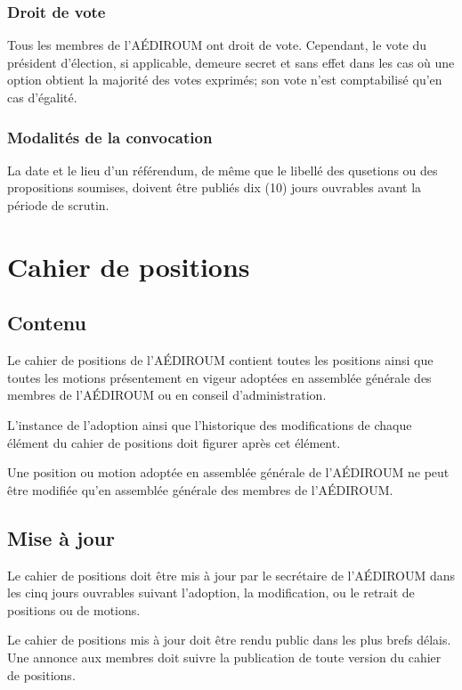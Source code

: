 \documentclass[12pt]{article}
\begin{document}
\subsubsection{Droit de vote}

Tous les membres de l'AÉDIROUM ont droit de vote. Cependant, le vote du président d'élection, si applicable, demeure secret et sans effet dans les cas où une option obtient la majorité des votes exprimés; son vote n'est comptabilisé qu'en cas d'égalité.

\subsubsection{Modalités de la convocation}

La date et le lieu d'un référendum, de même que le libellé des qusetions ou des propositions soumises, doivent être publiés dix (10) jours ouvrables avant la période de scrutin.

\section{Cahier de positions}

\subsection{Contenu}

Le cahier de positions de l’AÉDIROUM contient toutes les positions ainsi que toutes les motions présentement en vigeur adoptées en assemblée générale des membres de l’AÉDIROUM ou en conseil d’administration.

L’instance de l’adoption ainsi que l’historique des modifications de chaque élément du cahier de positions doit figurer après cet élément.

Une position ou motion adoptée en assemblée générale de l’AÉDIROUM ne peut être modifiée qu’en assemblée générale des membres de l’AÉDIROUM.

\subsection{Mise à jour}

Le cahier de positions doit être mis à jour par le secrétaire de l’AÉDIROUM dans les cinq jours ouvrables suivant l’adoption, la modification, ou le retrait de positions ou de motions.

Le cahier de positions mis à jour doit être rendu public dans les plus brefs délais. Une annonce aux membres doit suivre la publication de toute version du cahier de positions.
\end{document}
